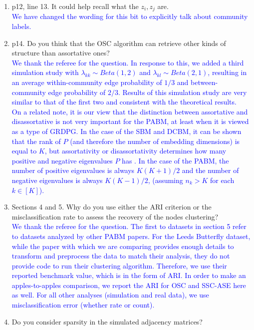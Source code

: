 \documentclass[
]{article}
\begin{document}
\begin{enumerate}
{  }
\item
  p12, line 13. It could help recall what the \(z_i, z_j\) are.\\
  \textcolor{blue}{
  We have changed the wording for this bit to explicitly talk about community labels. 
  }
\item
  p14. Do you think that the OSC algorithm can retrieve other kinds of
  structure than assortative ones?\\
  \textcolor{blue}{
  We thank the referee for the question.
  In response to this, we added a third simulation study with $\lambda_{kk} \sim Beta(1,2)$ and $\lambda_{kl} \sim Beta(2,1)$, resulting in an average within-community edge probability of $1/3$ and between-community edge probability of $2/3$. 
  Results of this simulation study are very similar to that of the first two and consistent with the theoretical results.
  }\\
  \textcolor{blue}{
  On a related note, it is our view that the distinction between assortative and disassortative is not very important for the PABM, at least when it is viewed as a type of GRDPG. 
  In the case of the SBM and DCBM, it can be shown that the rank of $P$ (and therefore the number of embedding dimensions) is equal to $K$, but assortativity or disassortativity determines how many positive and negative eigenvalues $P$ has \citep{rubindelanchy2017statistical}. 
  In the case of the PABM, the number of positive eigenvalues is always $K (K + 1) / 2$ and the number of negative eigenvalues is always $K (K - 1) / 2$, (assuming $n_k > K$ for each $k \in [K]$). 
  }
\item
  Sections 4 and 5. Why do you use either the ARI criterion or the
  misclassification rate to assess the recovery of the nodes
  clustering?\\
  \textcolor{blue}{
  We thank the referee for the question.
  The first to datasets in section 5 refer to datasets analyzed by other PABM papers. 
  For the Leeds Butterfly dataset, while the paper with which we are comparing \citep{noroozi2019estimation} provides enough details to transform and preprocess the data to match their analysis, they do not provide code to run their clustering algorithm. 
  Therefore, we use their reported benchmark value, which is in the form of ARI. 
  In order to make an apples-to-apples comparison, we report the ARI for OSC and SSC-ASE here as well. 
  For all other analyses (simulation and real data), we use misclassification error (whether rate or count). 
  }
\item
  Do you consider sparsity in the simulated adjacency matrices?

\end{enumerate}
\end{document}
